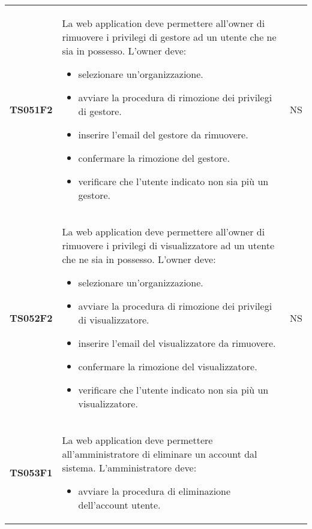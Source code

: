 \documentclass[../piano-di-qualifica.tex]{subfiles}
\begin{document}
\begin{longtable}[H]{>{\centering\bfseries}m{3cm} >{}m{10cm} >{\centering\arraybackslash}m{3cm}}
  TS051F2            & La web application deve permettere all'owner di rimuovere i privilegi di gestore ad un utente che ne sia in possesso. \newline
  L'owner deve:
  \begin{itemize}
    \item selezionare un'organizzazione.
    \item avviare la procedura di rimozione dei privilegi di gestore.
    \item inserire l'email del gestore da rimuovere.
    \item confermare la rimozione del gestore.
    \item verificare che l'utente indicato non sia più un gestore.
  \end{itemize}
                     & NS                                                                                                                                                                                                                                                               \\
  TS052F2            & La web application deve permettere all'owner di rimuovere i privilegi di visualizzatore ad un utente che ne sia in possesso. \newline
  L'owner deve:
  \begin{itemize}
    \item selezionare un'organizzazione.
    \item avviare la procedura di rimozione dei privilegi di visualizzatore.
    \item inserire l'email del visualizzatore da rimuovere.
    \item confermare la rimozione del visualizzatore.
    \item verificare che l'utente indicato non sia più un visualizzatore.
  \end{itemize}
                     & NS                                                                                                                                                                                                                                                               \\
  TS053F1            & La web application deve permettere all'amministratore di eliminare un account dal sistema. \newline
  L'amministratore deve:
  \begin{itemize}
    \item avviare la procedura di eliminazione dell'account utente.

\end{itemize}
\end{longtable}
\end{document}
